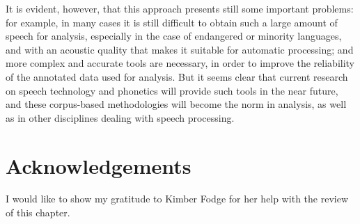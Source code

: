 \documentclass[output=paper]{langsci/langscibook}
\begin{document}
It is evident, however, that this approach presents still some important problems: for example, in many cases it is still difficult to obtain such a large amount of speech for analysis, especially in the case of endangered or minority languages, and with an acoustic quality that makes it suitable for automatic processing; and more complex and accurate tools are necessary, in order to improve the reliability of the annotated data used for analysis. But it seems clear that current research on speech technology and phonetics will provide such tools in the near future, and these corpus-based methodologies will become the norm in  analysis, as well as in other disciplines dealing with speech processing.

\section*{Acknowledgements}

I would like to show my gratitude to Kimber Fodge for her help with the review of this chapter.

\sloppy
\printbibliography[heading=subbibliography,notkeyword=this]
\end{document}
